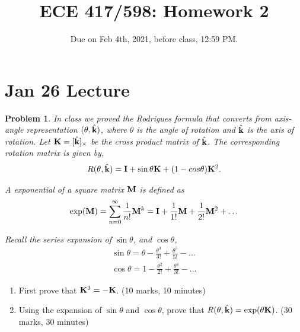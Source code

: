 \documentclass[twocolumn]{article}
\title{ECE 417/598: Homework 2}
\date{Due on Feb 4th, 2021, before class, 12:59 PM.}
\newtheorem{prob}{Problem}
\begin{document}
\maketitle
\section{Jan 26 Lecture}

\begin{prob}
  In class we proved the Rodrigues formula that converts from axis-angle
  representation $(\theta, \hat{\mathbf{k}})$, where $\theta$ is the angle of rotation
  and $\hat{\mathbf{k}}$ is the axis of rotation. Let $\mathbf{K} = [\hat{\mathbf{k}}]_{\times}$ be
  the cross product matrix of $\hat{\mathbf{k}}$. The corresponding rotation matrix is
  given by,
  \begin{align}
    R(\theta, \hat{\mathbf{k}}) = \mathbf{I} + \sin \theta \mathbf{K} + (1-cos \theta) \mathbf{K}^2.
  \end{align}

  A exponential of a square matrix $\mathbf{M}$ is defined as
  \begin{align}
    \exp(\mathbf{M}) = \sum_{n=0}^\infty \frac{1}{n!} \mathbf{M}^k = \mathbf{I} + \frac{1}{1!}\mathbf{M} + \frac{1}{2!}\mathbf{M}^2 + \dots
  \end{align}

  Recall the series expansion of $\sin \theta$, and $\cos \theta$,
  \begin{align}
    \sin \theta = \theta - \frac{\theta^3}{3!} + \frac{\theta^5}{5!} - \dots
    \\
    \cos \theta = 1 - \frac{\theta^2}{2!} + \frac{\theta^4}{3!} - \dots
  \end{align}
\end{prob}

  \begin{enumerate}
   \item First prove that $\mathbf{K}^3 = - \mathbf{K}$. (10 marks, 10 minutes)
   \item Using the expansion of $\sin\theta$ and $\cos\theta$, prove that
     $R(\theta, \hat{\mathbf{k}}) = \exp(\theta \mathbf{K})$. (30 marks, 30 minutes)
  \end{enumerate}
\end{document}

